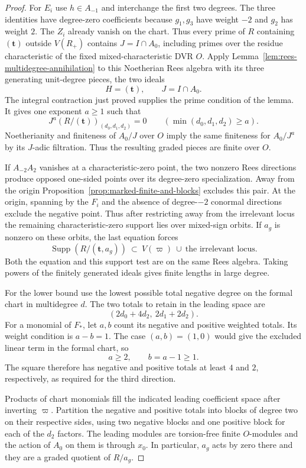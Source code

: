 \begin{proof}
For \(E_i\) use \(h\in A_{-1}\)
and interchange the first two degrees. The three identities have
degree-zero coefficients because \(g_1,g_3\) have weight \(-2\)
and \(g_2\) has weight \(2\). The \(Z_i\) already vanish on the
chart. Thus every prime of \(R\) containing \((\mathbf t)\) outside
\(V(R_+)\) contains \(J=I\cap A_0\), including primes over the
residue characteristic of the fixed mixed-characteristic DVR \(O\).
Apply Lemma~\ref{lem:rees-multidegree-annihilation} to this Noetherian Rees algebra with its three generating unit-degree pieces, the two ideals
\[
 H=(\mathbf t),\qquad J=I\cap A_0.
\]
The integral contraction just proved supplies the prime condition of the lemma. It gives one exponent \(a\ge1\) such that
\[
 J^a(R/(\mathbf t))_{(d_0,d_1,d_2)}=0
 \qquad(\min(d_0,d_1,d_2)\ge a).
\]
Noetherianity and finiteness of \(A_0/J\) over \(O\) imply
the same finiteness for \(A_0/J^a\) by its \(J\)-adic filtration.
Thus the resulting graded pieces are finite over \(O\).

If \(A_{-2}A_2\) vanishes at a characteristic-zero point,
the two nonzero Rees directions produce opposed one-sided
points over its degree-zero specialization. Away from the
origin Proposition~\ref{prop:marked-finite-and-blocks} excludes
this pair. At the origin, spanning by the \(F_i\) and the absence
of degree-\(-2\) conormal directions exclude the negative point.
Thus after restricting away from the irrelevant locus the remaining
characteristic-zero support lies over mixed-sign orbits. If \(a_g\)
is nonzero on these orbits, the last equation forces
\[
 \operatorname{Supp}(R/(\mathbf t,a_g))
   \ \subset\
       V(\varpi)\ \cup\ \text{the irrelevant locus}.
\]
Both the equation and this support test are on the same Rees algebra. Taking powers of the finitely
generated ideals gives finite lengths in large degree.
\label{cor:ordinary-symplectic-cohomology-16}

For the lower bound use the lowest possible total negative
degree on the formal chart in multidegree \(d\). The two totals to retain in the leading space are
\[
               (2d_0+4d_2,\ 2d_1+2d_2).
\] For a monomial of \(F_*\), let \(a,b\) count its negative and positive weighted totals. Its weight condition is \(a-b=1\). The case \((a,b)=(1,0)\) would give the excluded linear term in the formal chart, so
\[
 a\ge2,\qquad b=a-1\ge1 .
\]
The square therefore has negative and positive totals at least \(4\) and \(2\), respectively, as required for the third direction.

Products of chart monomials fill the indicated leading
coefficient space after inverting \(\varpi\). Partition the
negative and positive totals into blocks of degree two
on their respective sides, using two negative blocks and
one positive block for each of the \(d_2\) factors.
The leading modules are torsion-free finite \(O\)-modules
and the action of \(A_0\) on them is through \(x_0\).
In particular, \(a_g\) acts by zero there and they are a
graded quotient of \(R/a_g\).


\end{proof}
